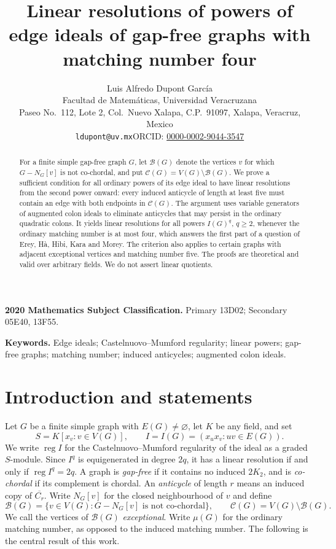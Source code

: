 \documentclass[11pt,a4paper]{article}
\title{\textbf{Linear resolutions of powers of edge ideals of gap-free graphs with matching number four}}
\author{Luis Alfredo Dupont Garc\'ia\\[2pt]
\small Facultad de Matem\'aticas, Universidad Veracruzana\\
\small Paseo No.~112, Lote 2, Col.~Nuevo Xalapa, C.P.~91097, Xalapa, Veracruz, Mexico\\
\small \texttt{ldupont@uv.mx}\quad ORCID: \href{https://orcid.org/0000-0002-9044-3547}{0000-0002-9044-3547}}
\date{}
\theoremstyle{remark}\newtheorem{remark}[theorem]{Remark}
\newcommand{\reg}{\operatorname{reg}}
\newcommand{\Bad}{\mathcal B}
\newcommand{\Good}{\mathcal C}
\begin{document}
\maketitle
\begin{abstract}
For a finite simple gap-free graph $G$, let $\Bad(G)$ denote the vertices $v$ for which $G-N_G[v]$ is not co-chordal, and put $\Good(G)=V(G)\setminus\Bad(G)$. We prove a sufficient condition for all ordinary powers of its edge ideal to have linear resolutions from the second power onward: every induced anticycle of length at least five must contain an edge with both endpoints in $\Good(G)$. The argument uses variable generators of augmented colon ideals to eliminate anticycles that may persist in the ordinary quadratic colons. It yields linear resolutions for all powers $I(G)^q$, $q\ge2$, whenever the ordinary matching number is at most four, which answers the first part of a question of Erey, H\`a, Hibi, Kara and Morey. The criterion also applies to certain graphs with adjacent exceptional vertices and matching number five. The proofs are theoretical and valid over arbitrary fields. We do not assert linear quotients.
\end{abstract}
\noindent\textbf{2020 Mathematics Subject Classification.} Primary 13D02; Secondary 05E40, 13F55.\par
\noindent\textbf{Keywords.} Edge ideals; Castelnuovo--Mumford regularity; linear powers; gap-free graphs; matching number; induced anticycles; augmented colon ideals.\par


\section{Introduction and statements}
Let $G$ be a finite simple graph with $E(G)\ne\varnothing$, let $K$ be any field, and set
\[
 S=K[x_v:v\in V(G)],\qquad I=I(G)=(x_ux_v:uv\in E(G)).
\]
We write $\reg I$ for the Castelnuovo--Mumford regularity of the ideal as a graded $S$-module. Since $I^q$ is equigenerated in degree $2q$, it has a linear resolution if and only if $\reg I^q=2q$.
A graph is \emph{gap-free} if it contains no induced $2K_2$, and is \emph{co-chordal} if its complement is chordal. An \emph{anticycle} of length $r$ means an induced copy of $\overline{C_r}$. Write $N_G[v]$ for the closed neighbourhood of $v$ and define
\[
 \Bad(G)=\{v\in V(G):G-N_G[v]\text{ is not co-chordal}\},\qquad
 \Good(G)=V(G)\setminus\Bad(G).
\]
We call the vertices of $\Bad(G)$ \emph{exceptional}. Write $\mu(G)$ for the ordinary matching number, as opposed to the induced matching number. The following is the central result of this work.
\end{document}
